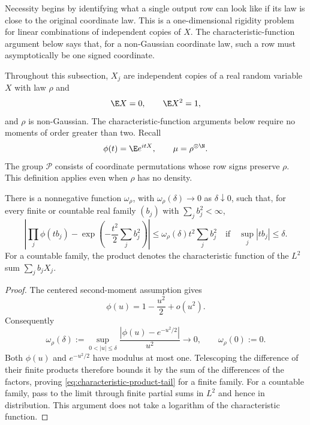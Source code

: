 Necessity begins by identifying what a single output row can look like if
its law is close to the original coordinate law.
This is a one-dimensional rigidity problem for linear combinations of
independent copies of \(X\).
The characteristic-function argument below says that, for a non-Gaussian
coordinate law, such a row must asymptotically be one signed coordinate.

Throughout this subsection, $X_j$ are independent copies of a real random
variable $X$ with law $\rho$ and
\[
  \E X=0,\qquad \E X^2=1,
\]
and $\rho$ is non-Gaussian.  The characteristic-function arguments
below require no moments of order greater than two.  Recall
\[
  \phi(t)=\E e^{itX},\qquad \mu=\rho^{\otimes\N}.
\]
The group $\mathcal P$ consists of coordinate permutations whose row
signs preserve $\rho$.  This definition applies even when $\rho$ has
no density.

\begin{lemma}
\label{lem:characteristic-product-tail}
There is a nonnegative function $\omega_\rho$, with
$\omega_\rho(\delta)\to0$ as
$\delta\downarrow0$, such that, for every finite or countable real family
$(b_j)$ with $\sum_j b_j^2<\infty$,
\begin{equation}
 \left|\prod_j\phi(tb_j)
       -\exp\!\left(-\frac{t^2}{2}\sum_jb_j^2\right)\right|
 \leq \omega_\rho(\delta)t^2\sum_jb_j^2
 \quad\text{if}\quad \sup_j|tb_j|\leq\delta.
 \label{eq:characteristic-product-tail}
\end{equation}
For a countable family, the product denotes the characteristic function
of the $L^2$ sum $\sum_jb_jX_j$.
\end{lemma}
\begin{proof}
The centered second-moment assumption gives
\[
 \phi(u)=1-\frac{u^2}{2}+o(u^2).
\]
Consequently
\[
 \omega_\rho(\delta):=
 \sup_{0<|u|\leq\delta}
 \frac{|\phi(u)-e^{-u^2/2}|}{u^2}
 \longrightarrow0,\qquad \omega_\rho(0):=0.
\]
Both $\phi(u)$ and $e^{-u^2/2}$ have modulus at most one.  Telescoping
the difference of their finite products therefore bounds it by the sum
of the differences of the factors, proving
\eqref{eq:characteristic-product-tail} for a finite family.
For a countable family, pass to the limit through finite partial sums in
$L^2$ and hence in distribution.  This argument does not take a logarithm
of the characteristic function.
\end{proof}

